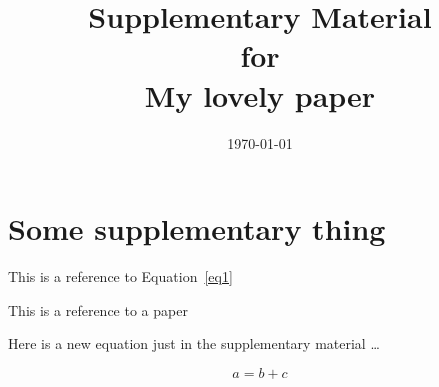 \documentclass{article}
\title{Supplementary Material\\for\\My lovely paper}
\date{\today}
\begin{document}
\maketitle

\section{Some supplementary thing}

This is a reference to Equation~\ref{eq1} 

This is a reference to a paper \citep{Vincent:2004ul}

Here is a new equation just in the supplementary material \ldots

\begin{equation}
\label{eq_thing}
  a = b + c
\end{equation}




\end{document}
